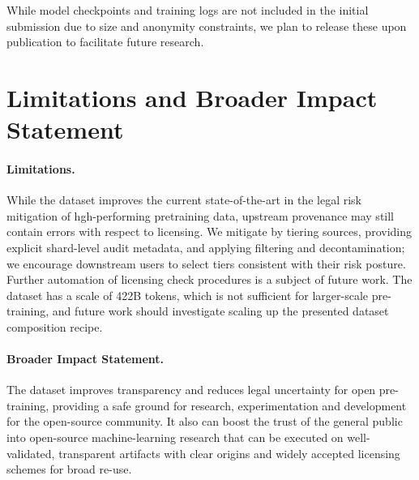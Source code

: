 While model checkpoints and training logs are not included in the initial submission due to size and anonymity constraints, we plan to release these upon publication to facilitate future research.


\section{Limitations and Broader Impact Statement}

\paragraph{Limitations.} While the dataset improves the current state-of-the-art in the legal risk mitigation of hgh-performing pretraining data, upstream provenance may still contain errors with respect to licensing. We mitigate by tiering sources, providing explicit shard-level audit metadata, and applying filtering and decontamination; we encourage downstream users to select tiers consistent with their risk posture. Further automation of licensing check procedures is a subject of future work. The dataset has a scale of 422B tokens, which is not sufficient for larger-scale pre-training, and future work should investigate scaling up the presented dataset composition recipe.

\paragraph{Broader Impact Statement.} The dataset improves transparency and reduces legal uncertainty for open pre-training, providing a safe ground for research, experimentation and development for the open-source community. It also can boost the trust of the general public into open-source machine-learning research that can be executed on well-validated, transparent artifacts with clear origins and widely accepted licensing schemes for broad re-use.